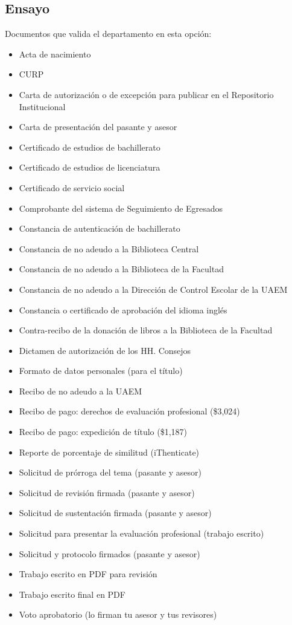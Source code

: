 \subsection{Ensayo}
Documentos que valida el departamento en esta opción:
\begin{itemize}
  \item Acta de nacimiento
  \item CURP
  \item Carta de autorización o de excepción para publicar en el Repositorio Institucional
  \item Carta de presentación del pasante y asesor
  \item Certificado de estudios de bachillerato
  \item Certificado de estudios de licenciatura
  \item Certificado de servicio social
  \item Comprobante del sistema de Seguimiento de Egresados
  \item Constancia de autenticación de bachillerato
  \item Constancia de no adeudo a la Biblioteca Central
  \item Constancia de no adeudo a la Biblioteca de la Facultad
  \item Constancia de no adeudo a la Dirección de Control Escolar de la UAEM
  \item Constancia o certificado de aprobación del idioma inglés
  \item Contra-recibo de la donación de libros a la Biblioteca de la Facultad
  \item Dictamen de autorización de los HH. Consejos
  \item Formato de datos personales (para el título)
  \item Recibo de no adeudo a la UAEM
  \item Recibo de pago: derechos de evaluación profesional (\$3,024)
  \item Recibo de pago: expedición de título (\$1,187)
  \item Reporte de porcentaje de similitud (iThenticate)
  \item Solicitud de prórroga del tema (pasante y asesor)
  \item Solicitud de revisión firmada (pasante y asesor)
  \item Solicitud de sustentación firmada (pasante y asesor)
  \item Solicitud para presentar la evaluación profesional (trabajo escrito)
  \item Solicitud y protocolo firmados (pasante y asesor)
  \item Trabajo escrito en PDF para revisión
  \item Trabajo escrito final en PDF
  \item Voto aprobatorio (lo firman tu asesor y tus revisores)
\end{itemize}
